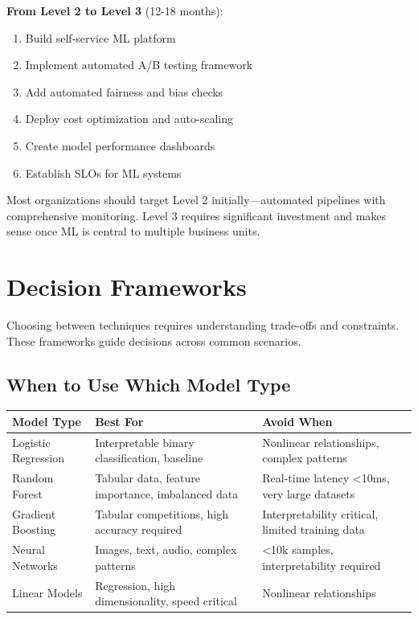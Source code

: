\textbf{From Level 2 to Level 3} (12-18 months):
\begin{enumerate}
    \item Build self-service ML platform
    \item Implement automated A/B testing framework
    \item Add automated fairness and bias checks
    \item Deploy cost optimization and auto-scaling
    \item Create model performance dashboards
    \item Establish SLOs for ML systems
\end{enumerate}

Most organizations should target Level 2 initially---automated pipelines with comprehensive monitoring. Level 3 requires significant investment and makes sense once ML is central to multiple business units.

\section{Decision Frameworks}

Choosing between techniques requires understanding trade-offs and constraints. These frameworks guide decisions across common scenarios.

\subsection{When to Use Which Model Type}

\begin{table}[h]
\centering
\small
\begin{tabular}{lp{6cm}p{4cm}}
\toprule
\textbf{Model Type} & \textbf{Best For} & \textbf{Avoid When} \\
\midrule
Logistic Regression & Interpretable binary classification, baseline & Nonlinear relationships, complex patterns \\
Random Forest & Tabular data, feature importance, imbalanced data & Real-time latency <10ms, very large datasets \\
Gradient Boosting & Tabular competitions, high accuracy required & Interpretability critical, limited training data \\
Neural Networks & Images, text, audio, complex patterns & <10k samples, interpretability required \\
Linear Models & Regression, high dimensionality, speed critical & Nonlinear relationships \\
\bottomrule
\end{tabular}
\end{table}

